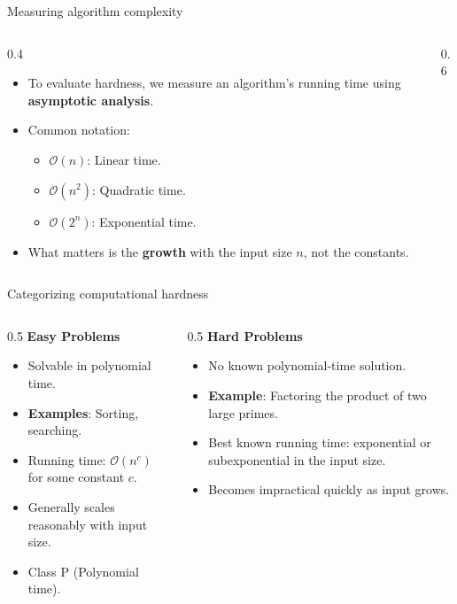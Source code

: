 \ifdefined\PRESENTATION\else\PassOptionsToClass{handout}{beamer}\fi\documentclass[aspectratio=169, lualatex]{beamer}
\begin{document}
\begin{frame}{Measuring algorithm complexity}
	\begin{columns}[c]
		\begin{column}{0.4\textwidth}
			\begin{itemize}[<+->]
				\item To evaluate hardness, we measure an algorithm's running time using \textbf{asymptotic analysis}.
				\item Common notation:
				      \begin{itemize}
					      \item $\mathcal{O}(n)$: Linear time.
					      \item $\mathcal{O}(n^2)$: Quadratic time.
					      \item $\mathcal{O}(2^n)$: Exponential time.
				      \end{itemize}
				\item What matters is the \textbf{growth} with the input size $n$, not the constants.
			\end{itemize}
		\end{column}
		\begin{column}{0.6\textwidth}
		\end{column}
	\end{columns}
\end{frame}

\begin{frame}{Categorizing computational hardness}
	\begin{columns}[c]
		\begin{column}{0.5\textwidth}
			\textbf{Easy Problems}
			\begin{itemize}[<+->]
				\item Solvable in polynomial time.
				\item \textbf{Examples}: Sorting, searching.
				\item Running time: $\mathcal{O}(n^c)$ for some constant $c$.
				\item Generally scales reasonably with input size.
				\item Class P (Polynomial time).
			\end{itemize}
		\end{column}
		\begin{column}{0.5\textwidth}
			\textbf{Hard Problems}
			\begin{itemize}[<+->]
				\item No known polynomial-time solution.
				\item \textbf{Example}: Factoring the product of two large primes.
				\item Best known running time: exponential or subexponential in the input size.
				\item Becomes impractical quickly as input grows.
			\end{itemize}
		\end{column}
	\end{columns}
\end{frame}
\end{document}

